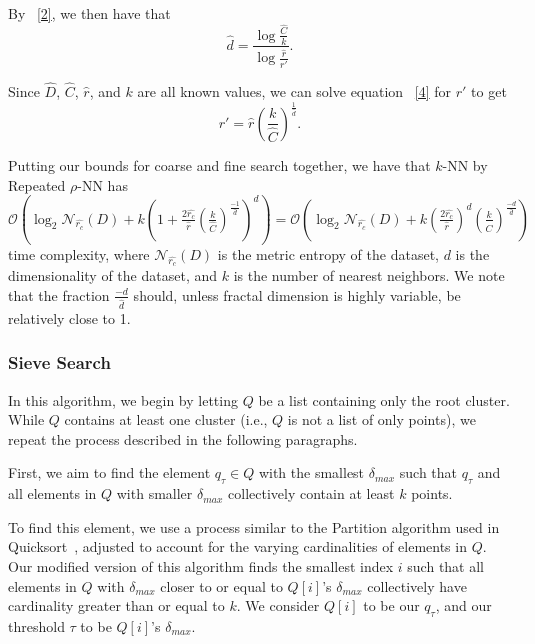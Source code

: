 By ~\ref{2}, we then have that \begin{equation} \hat{d} = \frac{\log{}\frac{\hat{C}}{k}}{\log{}\frac{\hat{r}}{r'}}. \label{5} \end{equation}

Since $\hat{D}$, $\hat{C}$, $\hat{r}$, and $k$ are all known values, we can solve equation ~\ref{4} for $r'$ to get
\begin{equation} r' = \hat{r}\left(\frac{k}{\hat{C}}\right)^{\frac{1}{\hat{d}}}. \label{6} \end{equation}
    
Putting our bounds for coarse and fine search together, we have that $k$-NN by Repeated $\rho$-NN has 
$\mathcal{O}\left(\log_2{\mathcal{N}_{\hat{r_c}}(D)} + k\left(1+ \frac{2\hat{r_c}}{\hat{r}}\left(\frac{k}{\hat{C}}\right)^{\frac{-1}{\hat{d}}}\right)^d\right) = 
\mathcal{O}\left(\log_2{\mathcal{N}_{\hat{r_c}}(D)} + k\left(\frac{2\hat{r_c}}{\hat{r}}\right)^d\left(\frac{k}{\hat{C}}\right)^{\frac{-d}{\hat{d}}}\right)$ 
time complexity, where $\mathcal{N}_{\hat{r_c}}(D)$ is the metric entropy of the dataset, $d$ is the dimensionality of the dataset, and $k$ is the number of nearest neighbors. We note that the fraction $\frac{-d}{\hat{d}}$ should, unless fractal dimension is highly variable, be relatively close to 1.

\subsubsection{Sieve Search}
\label{subsubsec:methods:knn-search:sieve}
In this algorithm, we begin by letting $Q$ be a list containing only the root cluster. 
While $Q$ contains at least one cluster (i.e., $Q$ is not a list of only points), we repeat the process described in 
the following paragraphs. 

First, 
we aim to find the element $q_{\tau} \in Q$ with the smallest $\delta_{max}$ such that 
$q_{\tau}$ and all elements in $Q$ with smaller $\delta_{max}$ collectively contain at least $k$ points. 

To find this element, 
we use a process similar to the Partition algorithm used in Quicksort~\cite{10.1093/comjnl/5.1.10}, adjusted to account for the varying cardinalities of elements in $Q$. 
Our modified version of this algorithm finds the smallest index $i$ such 
that all elements in $Q$ with $\delta_{max}$ closer to or equal to $Q[i]$'s $\delta_{max}$ collectively have cardinality greater
than or equal to $k$. We consider $Q[i]$ to be our $q_{\tau}$, and our threshold 
$\tau$ to be $Q[i]$'s $\delta_{max}$.

